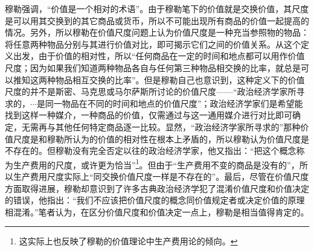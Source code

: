  穆勒强调，“价值是一个相对的术语”\cite[495]{YueHan*MuLeZhengZhiJingJiXueYuanLiJiQiZaiSheHuiZheXueShangDeRuoGanYingYongShangJuan1991}。由于穆勒笔下的价值就是交换价值，其尺度是可以用其交换到的其它商品或货币，所以不可能出现所有商品的价值一起提高的情况。另外，所以穆勒在价值尺度问题上认为价值尺度是一种充当参照物的物品：将任意两种物品分别与其进行价值对比，即可揭示它们之间的价值关系。\cite[102]{YueHan*MuLeZhengZhiJingJiXueYuanLiJiQiZaiSheHuiZheXueShangDeRuoGanYingYongXiaJuan1991}从这个定义出发，由于价值的相对性，所以“任何商品在一定的时间和地点都可以用作价值尺度；因为如果我们知道两种物品各自与任何第三种物品相交换的比率，就总是可以推知这两种物品相互交换的比率”\cite[102]{YueHan*MuLeZhengZhiJingJiXueYuanLiJiQiZaiSheHuiZheXueShangDeRuoGanYingYongXiaJuan1991}。但是穆勒自己也意识到，这种定义下的价值尺度的并不是斯密、马克思或马尔萨斯所讨论的价值尺度——“政治经济学家所寻求的，$\cdots$是同一物品在不同的时间和地点的价值尺度”\cite[103]{YueHan*MuLeZhengZhiJingJiXueYuanLiJiQiZaiSheHuiZheXueShangDeRuoGanYingYongXiaJuan1991}；政治经济学家们是希望能找到这样一种媒介，​一种商品的价值，仅需通过与这一通用媒介进行对比即可确定，无需再与其他任何特定商品逐一比较\cite[103]{YueHan*MuLeZhengZhiJingJiXueYuanLiJiQiZaiSheHuiZheXueShangDeRuoGanYingYongXiaJuan1991}。显然，“政治经济学家所寻求的”那种价值尺度是和穆勒所认为的价值的相对性在根本上矛盾的，所以穆勒认为价值尺度是不存在的\cite[104]{YueHan*MuLeZhengZhiJingJiXueYuanLiJiQiZaiSheHuiZheXueShangDeRuoGanYingYongXiaJuan1991}。但穆勒没有完全否定以往的政治经济学家，他又指出：“把这个概念称为生产费用的尺度，或许更为恰当”\footnote{这实际上也反映了穆勒的价值理论中生产费用论的倾向。}\cite[104]{YueHan*MuLeZhengZhiJingJiXueYuanLiJiQiZaiSheHuiZheXueShangDeRuoGanYingYongXiaJuan1991}。但由于“生产费用不变的商品是没有的”，所以生产费用尺度实际上“同交换价值尺度一样是不存在的”\cite[105]{YueHan*MuLeZhengZhiJingJiXueYuanLiJiQiZaiSheHuiZheXueShangDeRuoGanYingYongXiaJuan1991}。最后，尽管在价值尺度方面取得进展，穆勒却意识到了许多古典政治经济学犯了混淆价值尺度和价值决定的错误，他指出：“我们不应该把价值尺度的概念同价值规定者或决定价值的原理相混淆。”\cite[107]{YueHan*MuLeZhengZhiJingJiXueYuanLiJiQiZaiSheHuiZheXueShangDeRuoGanYingYongXiaJuan1991}笔者认为，在区分价值尺度和价值决定一点上，穆勒是相当值得肯定的。

